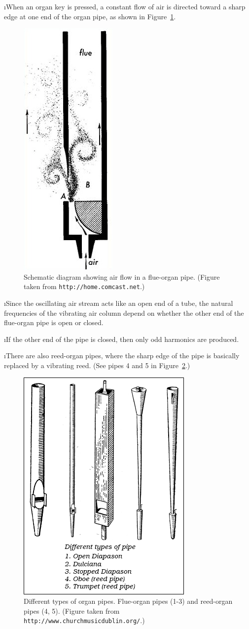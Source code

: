 \i When an organ key is pressed, a 
constant flow of air is directed toward a 
sharp edge at one end of the organ pipe,
as shown in Figure~\ref{f:fluepipe}.
%
\begin{figure}[htbp]
\begin{center}
\includegraphics[width=.3\textwidth]{fluepipe.jpg}
\caption{Schematic diagram showing air flow
in a flue-organ pipe.
(Figure taken from {\tt http://home.comcast.net}.)}
\label{f:fluepipe}
\end{center}
\end{figure}

\i Since the oscillating air stream acts like
an open end of a tube, the natural frequencies
of the vibrating air column depend on whether
the other end of the flue-organ pipe is open or closed.

\i If the other end of the pipe is closed, then 
only odd harmonics are produced.

\i There are also reed-organ pipes, where
the sharp edge of the pipe is basically replaced 
by a vibrating reed.
(See pipes 4 and 5 in Figure~\ref{f:pipes}.)
%
\begin{figure}[htbp]
\begin{center}
\includegraphics[height=.5\textwidth]{pipes.png}
\caption{Different types of organ pipes.
Flue-organ pipes (1-3) and reed-organ pipes (4, 5).
(Figure taken from 
{\tt http://www.churchmusicdublin.org/}.)}
\label{f:pipes}
\end{center}
\end{figure}

